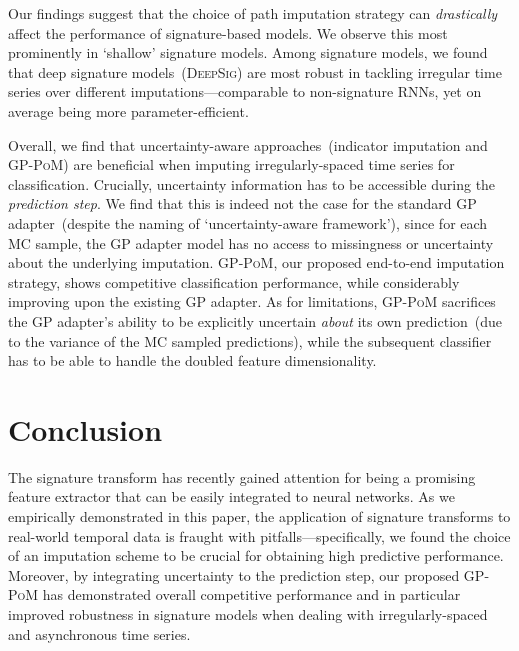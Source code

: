 \documentclass{article}
\begin{document}
Our findings suggest that the choice of path imputation strategy can
\emph{drastically} affect the performance of signature-based models. We
observe this most prominently in `shallow' signature models. Among
signature models, we found that deep signature models~(\textsc{DeepSig})
are most robust in tackling irregular time series over different
imputations---comparable to non-signature RNNs, yet on average being
more parameter-efficient.

Overall, we find that uncertainty-aware approaches~(indicator
imputation and \textsc{GP-PoM}) are beneficial when imputing
irregularly-spaced time series for classification.
%
Crucially, uncertainty information has to be accessible during the
\emph{prediction step}. We find that this is indeed not the case for
the standard GP adapter~(despite the naming of `uncertainty-aware
framework'), since for each MC sample, the GP adapter model has no access
to missingness or uncertainty about the underlying imputation.
\textsc{GP-PoM}, our proposed end-to-end imputation strategy, shows
competitive classification performance, while considerably improving
upon the existing GP adapter. As for
limitations, \textsc{GP-PoM} sacrifices the GP adapter's ability to be
explicitly uncertain \emph{about} its own prediction~(due to the
variance of the MC sampled predictions), while the subsequent classifier
has to be able to handle the doubled feature dimensionality.

\section{Conclusion}

The signature transform has recently gained attention for being
a promising feature extractor that can be easily integrated to neural
networks. As we empirically demonstrated in this paper, the application
of signature transforms to real-world temporal data is fraught with
pitfalls---specifically, we found the choice of an imputation scheme to
be crucial for obtaining high predictive performance. Moreover, by integrating uncertainty to the prediction step, our proposed \textsc{GP-PoM} has demonstrated overall competitive performance and in particular improved robustness in signature models when dealing with irregularly-spaced and asynchronous time series. 
\end{document}
